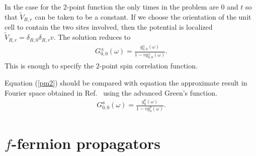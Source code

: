 \documentclass[aps,pra,preprint,groupedaddress]{revtex4-1}
\newcommand{\1}{\mathds{1}}
\begin{document}
In the case for the 2-point function the only times in the problem are $0$ and $t$ so that $\tilde{V}_{R,r}$ can be taken to be a constant. %
If we choose the orientation of the unit cell to contain the two sites involved, then the potential is localized $\tilde{V}_{R,r} = \delta_{R,0} \delta_{R,r} v$. The solution reduces to
\begin{align}\label{pm2}
G^\pm_{0,0}(\omega) = \frac{g^\pm_{0,0}(\omega)}{1 - v g^\pm_{0,0}(\omega)}.
\end{align}
This is enough to specify the 2-point spin correlation function. %


Equation (\ref{pm2}) should be compared with equation the approximate result in Fourier space obtained in Ref.~ using the advanced Green's function.
\begin{align}
G^a_{0,0}(\omega) = \frac{g^a_0(\omega)}{1-v g^a_0(\omega)}.
\end{align}




\section[f-fermion propagators]{$f$-fermion propagators}

\end{document}
